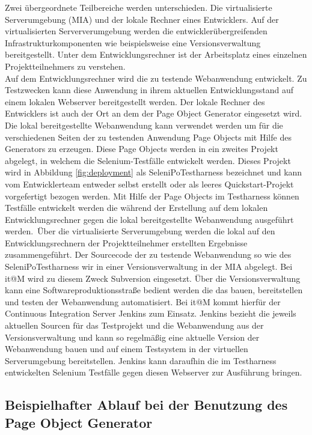 Zwei übergeordnete Teilbereiche werden unterschieden. Die virtualisierte Serverumgebung (MIA) und der lokale Rechner eines Entwicklers. Auf der virtualisierten Serververumgebung werden die entwicklerübergreifenden Infrastrukturkomponenten wie beispielsweise eine Versionsverwaltung bereitgestellt. Unter dem Entwicklungsrechner ist der Arbeitsplatz eines einzelnen Projektteilnehmers zu verstehen.\\
Auf dem Entwicklungsrechner wird die zu testende Webanwendung entwickelt. Zu Testzwecken kann diese Anwendung in ihrem aktuellen Entwicklungsstand auf einem lokalen Webserver bereitgestellt werden.
Der lokale Rechner des Entwicklers ist auch der Ort an dem der Page Object Generator eingesetzt wird. Die lokal bereitgestellte Webanwendung kann verwendet werden um für die verschiedenen Seiten der zu testenden Anwendung Page Objects mit Hilfe des Generators zu erzeugen. Diese Page Objects werden in ein zweites Projekt abgelegt, in welchem die Selenium-Testfälle entwickelt werden. Dieses Projekt wird in Abbildung \ref{fig:deployment} als SeleniPoTestharness bezeichnet und kann vom Entwicklerteam entweder selbst erstellt oder als leeres Quickstart-Projekt vorgefertigt bezogen werden. Mit Hilfe der Page Objects im Testharness können Testfälle entwickelt werden die während der Erstellung auf dem lokalen Entwicklungsrechner gegen die lokal bereitgestellte Webanwendung ausgeführt werden.\
Über die virtualisierte Serverumgebung werden die lokal auf den Entwicklungsrechnern der Projektteilnehmer erstellten Ergebnisse zusammengeführt. 
Der Sourcecode der zu testende Webanwendung so wie des SeleniPoTestharness wir in einer Versionsverwaltung in der MIA abgelegt. Bei it@M wird zu diesem Zweck Subversion eingesetzt. Über die Versionsverwaltung kann eine Softwareproduktionsstraße bedient werden die das bauen, bereitstellen und testen der Webanwendung automatisiert. Bei it@M kommt hierfür der Continuous Integration Server Jenkins zum Einsatz. Jenkins bezieht die jeweils aktuellen Sourcen für das Testprojekt und die Webanwendung aus der Versionsverwaltung und kann so regelmäßig eine aktuelle Version der Webanwendung bauen und auf einem Testsystem in der virtuellen Serverumgebung bereitstellen. Jenkins kann daraufhin die im Testharness entwickelten Selenium Testfälle gegen diesen Webserver zur Ausführung bringen.



\subsection{Beispielhafter Ablauf bei der Benutzung des Page Object Generator}
\label{sec:moeglicher_ablauf_eines_standartanwendungsfall}


